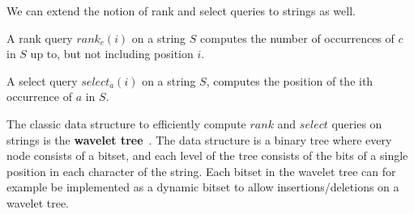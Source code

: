 We can extend the notion of rank and select queries to strings as well. 

\begin{definition}

    A rank query $rank_c(i)$ on a string $S$ computes the number of occurrences of $c$
    in $S$ up to, but not including position $i$.

\end{definition}
\begin{definition}

    A select query $select_a(i)$ on a string $S$, computes the position of the ith
    occurrence of $a$ in $S$. 

\end{definition}

The classic data structure to efficiently compute $rank$ and $select$ queries on strings
is the \textbf{wavelet tree}~\cite{WaveletTree}. The data structure is a binary tree where every
node consists of a bitset, and each level of the tree consists of the bits of a single
position in each character of the string. Each bitset in the wavelet tree can for example
be implemented as a dynamic bitset to allow insertions/deletions on a wavelet tree.

